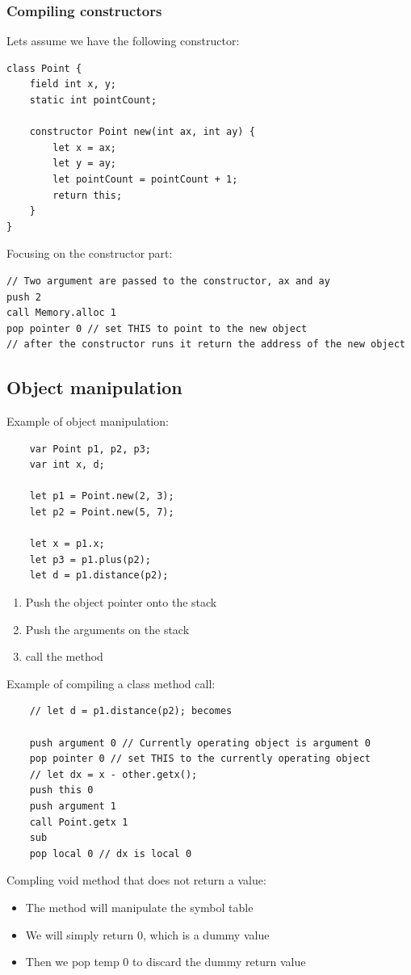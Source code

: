 \documentclass[12pt,a4paper]{article}
\begin{document}
\subsubsection{Compiling constructors}
Lets assume we have the following constructor:
\begin{verbatim}
class Point {
    field int x, y;
    static int pointCount;

    constructor Point new(int ax, int ay) {
        let x = ax;
        let y = ay;
        let pointCount = pointCount + 1;
        return this;
    }
}
\end{verbatim}
Focusing on the constructor part:
\begin{verbatim}
// Two argument are passed to the constructor, ax and ay
push 2 
call Memory.alloc 1 
pop pointer 0 // set THIS to point to the new object
// after the constructor runs it return the address of the new object
\end{verbatim}

\subsection{Object manipulation}
Example of object manipulation:
\begin{verbatim}
    var Point p1, p2, p3;
    var int x, d;

    let p1 = Point.new(2, 3);
    let p2 = Point.new(5, 7);

    let x = p1.x;    
    let p3 = p1.plus(p2);
    let d = p1.distance(p2);
\end{verbatim}
\begin{enumerate}
    \item Push the object pointer onto the stack
    \item Push the arguments on the stack
    \item call the method
\end{enumerate}

Example of compiling a class method call:
\begin{verbatim}
    // let d = p1.distance(p2); becomes

    push argument 0 // Currently operating object is argument 0 
    pop pointer 0 // set THIS to the currently operating object
    // let dx = x - other.getx();
    push this 0 
    push argument 1
    call Point.getx 1
    sub 
    pop local 0 // dx is local 0
\end{verbatim}

Compling void method that does not return a value:
\begin{itemize}
    \item The method will manipulate the symbol table
    \item We will simply return 0, which is a dummy value
    \item Then we pop temp 0 to discard the dummy return value
\end{itemize}
\end{document}
